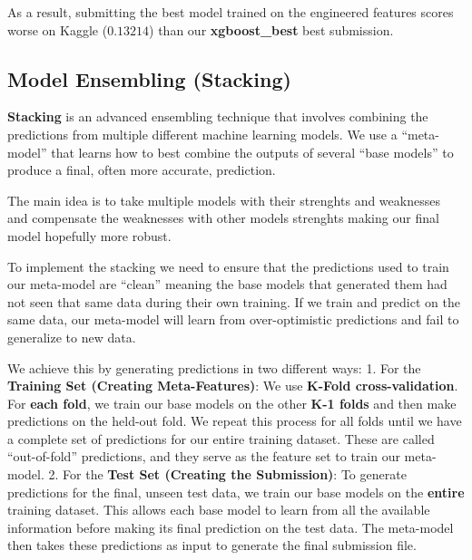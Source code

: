 \documentclass[11pt]{article}
\begin{document}
    As a result, submitting the best model trained on the engineered
features scores worse on Kaggle (\(0.13214\)) than our
\textbf{xgboost\_best} best submission.

    \subsection{Model Ensembling
(Stacking)}\label{model-ensembling-stacking}

    \textbf{Stacking} is an advanced ensembling technique that involves
combining the predictions from multiple different machine learning
models. We use a ``meta-model'' that learns how to best combine the
outputs of several ``base models'' to produce a final, often more
accurate, prediction.

The main idea is to take multiple models with their strenghts and
weaknesses and compensate the weaknesses with other models strenghts
making our final model hopefully more robust.

To implement the stacking we need to ensure that the predictions used to
train our meta-model are ``clean'' meaning the base models that
generated them had not seen that same data during their own training. If
we train and predict on the same data, our meta-model will learn from
over-optimistic predictions and fail to generalize to new data.

We achieve this by generating predictions in two different ways: 1. For
the \textbf{Training Set (Creating Meta-Features)}: We use
\textbf{K-Fold cross-validation}. For \textbf{each fold}, we train our
base models on the other \textbf{K-1 folds} and then make predictions on
the held-out fold. We repeat this process for all folds until we have a
complete set of predictions for our entire training dataset. These are
called ``out-of-fold'' predictions, and they serve as the feature set to
train our meta-model. 2. For the \textbf{Test Set (Creating the
Submission)}: To generate predictions for the final, unseen test data,
we train our base models on the \textbf{entire} training dataset. This
allows each base model to learn from all the available information
before making its final prediction on the test data. The meta-model then
takes these predictions as input to generate the final submission file.
\end{document}
